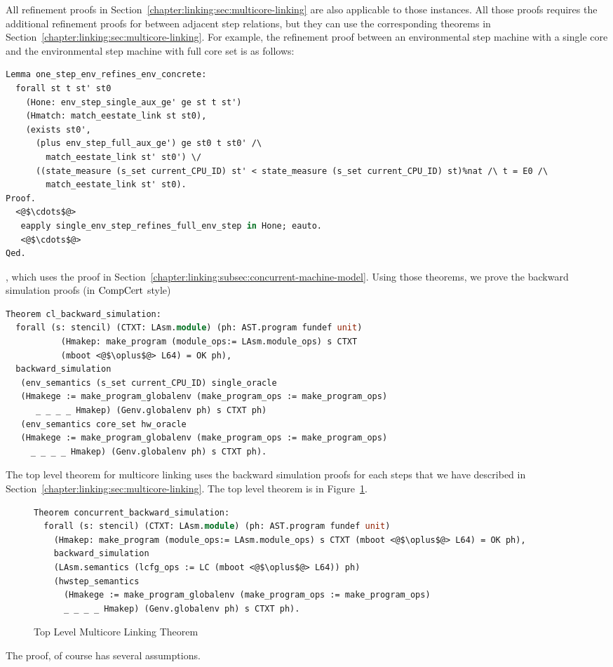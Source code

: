 All refinement proofs in Section~\ref{chapter:linking:sec:multicore-linking} are also applicable 
to those instances. 
All those proofs requires the additional refinement proofs for between adjacent step relations, but they can 
use the corresponding theorems in Section~\ref{chapter:linking:sec:multicore-linking}. 
For example, the refinement proof between an environmental step machine with a single core and the environmental step machine with full core set is 
as follows:
\begin{lstlisting}[language=Caml]
Lemma one_step_env_refines_env_concrete:
  forall st t st' st0
    (Hone: env_step_single_aux_ge' ge st t st')
    (Hmatch: match_eestate_link st st0),
    (exists st0',
      (plus env_step_full_aux_ge') ge st0 t st0' /\
        match_eestate_link st' st0') \/
      ((state_measure (s_set current_CPU_ID) st' < state_measure (s_set current_CPU_ID) st)%nat /\ t = E0 /\
        match_eestate_link st' st0).
Proof.
  <@$\cdots$@>
   eapply single_env_step_refines_full_env_step in Hone; eauto.
   <@$\cdots$@>
Qed.
\end{lstlisting}
, which uses the proof in Section~\ref{chapter:linking:subsec:concurrent-machine-model}.
Using those theorems, 
we prove the backward simulation proofs (in $\mathrm{CompCert}$ style) 
\begin{lstlisting}[language=Caml]
Theorem cl_backward_simulation:
  forall (s: stencil) (CTXT: LAsm.module) (ph: AST.program fundef unit)
           (Hmakep: make_program (module_ops:= LAsm.module_ops) s CTXT 
           (mboot <@$\oplus$@> L64) = OK ph),
  backward_simulation
   (env_semantics (s_set current_CPU_ID) single_oracle
   (Hmakege := make_program_globalenv (make_program_ops := make_program_ops)
      _ _ _ _ Hmakep) (Genv.globalenv ph) s CTXT ph)
   (env_semantics core_set hw_oracle
   (Hmakege := make_program_globalenv (make_program_ops := make_program_ops) 
     _ _ _ _ Hmakep) (Genv.globalenv ph) s CTXT ph).
\end{lstlisting}

The top level theorem for multicore linking uses the backward simulation proofs 
for each steps that we have described in Section~\ref{chapter:linking:sec:multicore-linking}.
The top level theorem is in Figure~\ref{fig:chapter:certikos:top-level-multicore-theorem}.

\begin{figure}
\begin{lstlisting}[language=Caml]
Theorem concurrent_backward_simulation:
  forall (s: stencil) (CTXT: LAsm.module) (ph: AST.program fundef unit)
    (Hmakep: make_program (module_ops:= LAsm.module_ops) s CTXT (mboot <@$\oplus$@> L64) = OK ph),
    backward_simulation
    (LAsm.semantics (lcfg_ops := LC (mboot <@$\oplus$@> L64)) ph)          
    (hwstep_semantics 
      (Hmakege := make_program_globalenv (make_program_ops := make_program_ops) 
      _ _ _ _ Hmakep) (Genv.globalenv ph) s CTXT ph).
\end{lstlisting}
\caption{Top Level Multicore Linking Theorem}
\label{fig:chapter:certikos:top-level-multicore-theorem}
\end{figure}

The proof, of course has several assumptions. 

